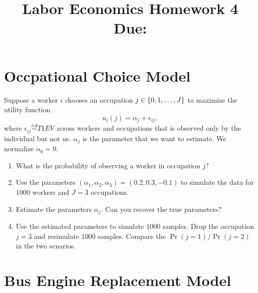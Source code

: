 \documentclass[12pt]{article}
\title{
    Labor Economics Homework 4 \\
    \large Due: \\
    }
\author{}
\date{}
\begin{document}
    

\maketitle
\vspace{-2cm}

\section{Occpational Choice Model}
Suppose a worker $i$ chooses an occupation $j\in\left\{ {0,1,\ldots,J} \right\}$ 
to maximize the utility function 
\begin{equation*}
    u_i(j) = \alpha_j + \epsilon_{ij},
\end{equation*}
where $\epsilon_{ij}\overset{iid}{\sim}T1EV$ across workers and occupations 
that is observed only by the individual but not us. $\alpha_j$ is the 
parameter that we want to estimate. We normalize $\alpha_0 = 0$.
\begin{enumerate}
    \item What is the probability of observing a worker in occupation $j$?
    \item Use the parameters $(\alpha_1, \alpha_2, \alpha_3) = (0.2, 0.3, -0.1)$ 
    to simulate the data for $1000$ workers and $J=3$ occupations.
    \item Estimate the parameters $\alpha_j$. Can you recover the true parameters?
    \item Use the estimated parameters to simulate $1000$ samples. 
    Drop the occupation $j=3$ and resimulate $1000$ samples. Compare the 
    $\Pr(j=1)/\Pr(j=2)$ in the two scnarios.  
\end{enumerate}

\section{Bus Engine Replacement Model}
\end{document}
